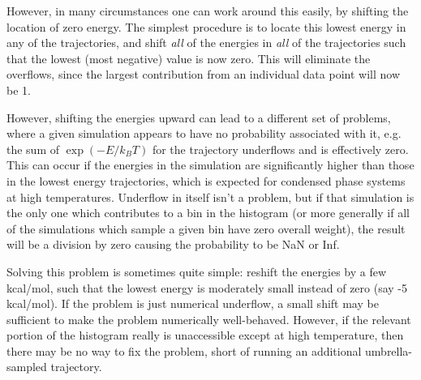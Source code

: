 \documentclass[12pt]{article}
\begin{document}
However, in many circumstances one can work around this easily, by shifting
the location of zero energy.  The simplest procedure is to locate this lowest
energy in any of the trajectories, and shift \emph{all} of the energies in
\emph{all} of the trajectories such that the lowest (most negative) value is
now zero.  This will eliminate the overflows, since the largest contribution
from an individual data point will now be 1.  

However, shifting the energies upward can lead to a different set of
problems, where a given simulation appears to have no probability associated
with it, e.g. the sum of $\exp(-E/k_B T)$ for the trajectory underflows and
is effectively zero.  This can occur if the energies in the simulation are
significantly higher than those in the lowest energy trajectories, which is
expected for condensed phase systems at high temperatures. Underflow in
itself isn't a problem, but if that simulation is the only one which
contributes to a bin in the histogram (or more generally if all of the
simulations which sample a given bin have zero overall weight), the result
will be a division by zero causing the probability to be NaN or Inf.  

Solving this problem is sometimes quite simple: reshift the energies by a few
kcal/mol, such that the lowest energy is moderately small instead of zero
(say -5 kcal/mol).  If the problem is just numerical underflow, a small shift
may be sufficient to make the problem numerically well-behaved.  However, if
the relevant portion of the histogram really is unaccessible except at high
temperature, then there may be no way to fix the problem, short of running an
additional umbrella-sampled trajectory.
\end{document}
